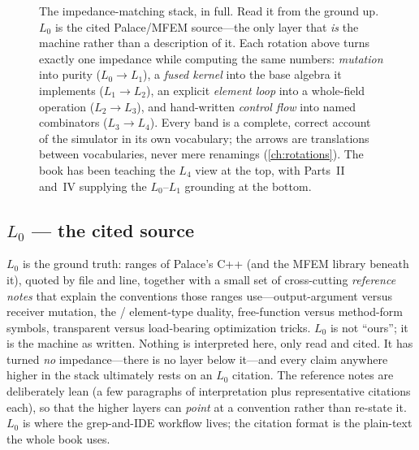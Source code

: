 \begin{figure}[p]
{%
}
\caption[The five-layer impedance-matching stack]{The impedance-matching stack, in
full. Read it from the ground up. $L_0$ is the cited Palace/MFEM source---the only
layer that \emph{is} the machine rather than a description of it. Each rotation above
turns exactly one impedance while computing the same numbers: \emph{mutation} into
purity ($L_0\!\to\!L_1$), a \emph{fused kernel} into the base algebra it implements
($L_1\!\to\!L_2$), an explicit \emph{element loop} into a whole-field operation
($L_2\!\to\!L_3$), and hand-written \emph{control flow} into named combinators
($L_3\!\to\!L_4$). Every band is a complete, correct account of the simulator in its
own vocabulary; the arrows are translations between vocabularies, never mere
renamings (\cref{ch:rotations}). The book has been teaching the $L_4$ view at the top,
with Parts~II and~IV supplying the $L_0$--$L_1$ grounding at the bottom.}
\label{fig:appstack}
\end{figure}

\subsection*{$L_0$ --- the cited source}

$L_0$ is the ground truth: ranges of Palace's C++ (and the MFEM library beneath it),
quoted by file and line, together with a small set of cross-cutting \emph{reference
notes} that explain the conventions those ranges use---output-argument versus
receiver mutation, the / element-type duality,
free-function versus method-form symbols, transparent versus load-bearing
optimization tricks. $L_0$ is not ``ours''; it is the machine as written. Nothing is
interpreted here, only read and cited. It has turned \emph{no} impedance---there is no
layer below it---and every claim anywhere higher in the stack ultimately rests on an
$L_0$ citation. The reference notes are deliberately lean (a few paragraphs of
interpretation plus representative citations each), so that the higher layers can
\emph{point} at a convention rather than re-state it. $L_0$ is where the grep-and-IDE
workflow lives; the citation format is the plain-text 
the whole book uses.

